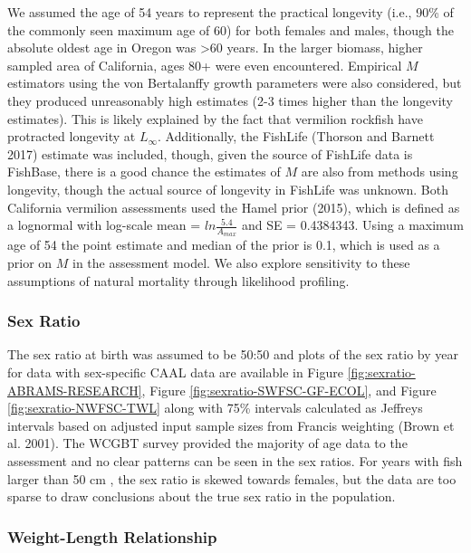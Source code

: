 \documentclass[
  english,
  a4paper,
]{article}
\begin{document}
We assumed the age of 54 years to represent the practical longevity (i.e., 90\% of
the commonly seen maximum age of 60) for both females and males, though the absolute
oldest age in Oregon was \textgreater60 years. In the larger biomass, higher sampled area of
California, ages 80+ were even encountered. Empirical \(M\) estimators using the von
Bertalanffy growth parameters were also considered, but they produced unreasonably
high estimates (2-3 times higher than the longevity estimates). This is likely
explained by the fact that vermilion rockfish have protracted longevity at \(L_{\infty}\).
Additionally, the FishLife (Thorson and Barnett 2017) estimate was included, though, given
the source of FishLife data is FishBase, there is a good chance the estimates of
\(M\) are also from methods using longevity, though the actual source of longevity
in FishLife was unknown.
Both California vermilion assessments used the Hamel prior (2015), which
is defined as a lognormal with log-scale mean = \(ln\frac{5.4}{A_{max}}\) and SE = 0.4384343.
Using a maximum age of 54 the point estimate and median of the prior is 0.1, which
is used as a prior on \(M\) in the assessment model. We also explore sensitivity to
these assumptions of natural mortality through likelihood profiling.

\hypertarget{sex-ratio}{%
\subsubsection{Sex Ratio}\label{sex-ratio}}

The sex ratio at birth was assumed to be 50:50 and plots of the sex ratio by year for data with sex-specific CAAL data are available in Figure \ref{fig:sexratio-ABRAMS-RESEARCH}, Figure \ref{fig:sexratio-SWFSC-GF-ECOL}, and
Figure \ref{fig:sexratio-NWFSC-TWL} along with 75\% intervals calculated as Jeffreys intervals based on adjusted input sample sizes from Francis weighting (Brown et al. 2001). The WCGBT survey provided the majority of age data to the assessment and no clear patterns can be seen in the sex ratios. For years with fish larger than 50 cm , the sex ratio is skewed towards females, but the data are too sparse to draw conclusions about the true sex ratio in the population.

\hypertarget{weight-length-relationship}{%
\subsubsection{Weight-Length Relationship}\label{weight-length-relationship}}
\end{document}
